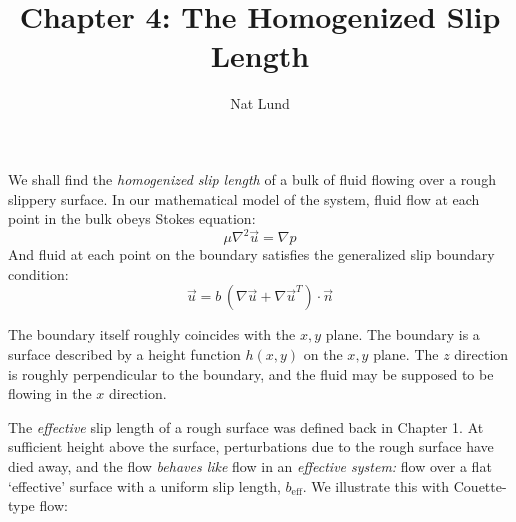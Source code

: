 \documentclass[a4paper]{report}
\title{Chapter 4: The Homogenized Slip Length}
\author{Nat Lund}
\newcommand{\beff}{\ensuremath{b_{\mathrm{eff}}}}
\begin{document}
\maketitle

We shall find the \emph{homogenized slip length} of a bulk of fluid flowing over a rough slippery surface.  In our mathematical model of the system,
fluid flow at each point in the bulk obeys Stokes equation:
\begin{equation}
\mu \nabla^2 \vec{u} = \nabla p
\end{equation}
And fluid at each point on the boundary satisfies the generalized slip boundary condition:
\begin{equation}
\vec{u} = b \, (\nabla \vec{u} + \nabla \vec{u}^T) \cdot \vec{n}
\end{equation}

The boundary itself roughly coincides with the $x,y$ plane. The boundary is a surface described by a height function $h(x,y)$ on the $x,y$ plane.  The $z$ direction is roughly perpendicular to the boundary, and the fluid may be supposed to be flowing in the $x$ direction. 

\begin{center}
\end{center}

The \emph{effective} slip length of a rough surface was defined back in Chapter 1.  At sufficient height above the surface, perturbations due to the rough surface have died away, and the flow \emph{behaves like} flow in an \emph{effective system:} flow over a flat `effective' surface with a uniform slip length, $\beff$. We illustrate this with Couette-type flow:
\end{document}
